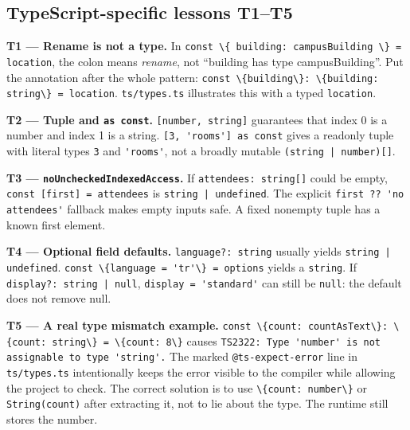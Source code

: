 \documentclass[
  10pt,
]{article}
\newcommand{\passthrough}[1]{#1}
\begin{document}
\subsection{TypeScript-specific lessons
T1--T5}\label{typescript-specific-lessons-t1t5}

\textbf{T1 --- Rename is not a type.} In
\passthrough{\lstinline!const \{ building: campusBuilding \} = location!},
the colon means \emph{rename}, not ``building has type campusBuilding''.
Put the annotation after the whole pattern:
\passthrough{\lstinline!const \{building\}: \{building: string\} = location!}.
\passthrough{\lstinline!ts/types.ts!} illustrates this with a typed
\passthrough{\lstinline!location!}.

\textbf{T2 --- Tuple and \passthrough{\lstinline!as const!}.}
\passthrough{\lstinline![number, string]!} guarantees that index 0 is a
number and index 1 is a string.
\passthrough{\lstinline![3, 'rooms'] as const!} gives a readonly tuple
with literal types \passthrough{\lstinline!3!} and
\passthrough{\lstinline!'rooms'!}, not a broadly mutable
\passthrough{\lstinline!(string | number)[]!}.

\textbf{T3 --- \passthrough{\lstinline!noUncheckedIndexedAccess!}.} If
\passthrough{\lstinline!attendees: string[]!} could be empty,
\passthrough{\lstinline!const [first] = attendees!} is
\passthrough{\lstinline!string | undefined!}. The explicit
\passthrough{\lstinline!first ?? 'no attendees'!} fallback makes empty
inputs safe. A fixed nonempty tuple has a known first element.

\textbf{T4 --- Optional field defaults.}
\passthrough{\lstinline!language?: string!} usually yields
\passthrough{\lstinline!string | undefined!}.
\passthrough{\lstinline!const \{language = 'tr'\} = options!} yields a
\passthrough{\lstinline!string!}. If
\passthrough{\lstinline!display?: string | null!},
\passthrough{\lstinline!display = 'standard'!} can still be
\passthrough{\lstinline!null!}: the default does not remove null.

\textbf{T5 --- A real type mismatch example.}
\passthrough{\lstinline!const \{count: countAsText\}: \{count: string\} = \{count: 8\}!}
causes
\passthrough{\lstinline!TS2322: Type 'number' is not assignable to type 'string'.!}
The marked \passthrough{\lstinline!@ts-expect-error!} line in
\passthrough{\lstinline!ts/types.ts!} intentionally keeps the error
visible to the compiler while allowing the project to check. The correct
solution is to use \passthrough{\lstinline!\{count: number\}!} or
\passthrough{\lstinline!String(count)!} after extracting it, not to lie
about the type. The runtime still stores the number.
\end{document}
